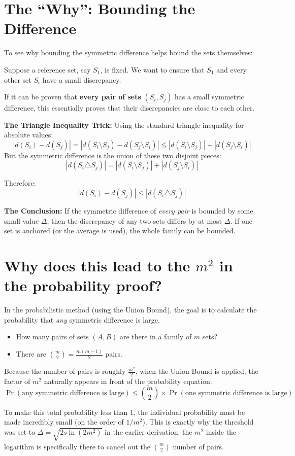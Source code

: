 \documentclass[11pt]{article}
\begin{document}
\hrulefill

\section{The ``Why'': Bounding the Difference}

To see why bounding the symmetric difference helps bound the sets themselves:

Suppose a reference set, say \(S_1\), is fixed. We want to ensure that \(S_1\) and every other set \(S_i\) have a small discrepancy. 

If it can be proven that \textbf{every pair of sets} \((S_i, S_j)\) has a small symmetric difference, this essentially proves that their discrepancies are close to each other. 

\textbf{The Triangle Inequality Trick:}
Using the standard triangle inequality for absolute values:
\[
 |d(S_i) - d(S_j)| = |d(S_i \setminus S_j) - d(S_j \setminus S_i)| \le |d(S_i \setminus S_j)| + |d(S_j \setminus S_i)| 
\]
But the symmetric difference is the union of these two disjoint pieces:
\[
 |d(S_i \triangle S_j)| = |d(S_i \setminus S_j)| + |d(S_j \setminus S_i)| 
\]

Therefore:
\[
 |d(S_i) - d(S_j)| \le |d(S_i \triangle S_j)| 
\]

\textbf{The Conclusion:} If the symmetric difference of \emph{every pair} is bounded by some small value \(\Delta\), then the discrepancy of any two sets differs by at most \(\Delta\). If one set is anchored (or the average is used), the whole family can be bounded.

\hrulefill

\section{Why does this lead to the \(m^2\) in the probability proof?}

In the probabilistic method (using the Union Bound), the goal is to calculate the probability that \emph{any} symmetric difference is large. 

\begin{itemize}
    \item How many pairs of sets \((A, B)\) are there in a family of \(m\) sets? 
    \item There are \(\binom{m}{2} = \frac{m(m-1)}{2}\) pairs.
\end{itemize}

Because the number of pairs is roughly \(\frac{m^2}{2}\), when the Union Bound is applied, the factor of \(m^2\) naturally appears in front of the probability equation:
\[
 \Pr(\text{any symmetric difference is large}) \le \binom{m}{2} \times \Pr(\text{one symmetric difference is large}) 
\]

To make this total probability less than 1, the individual probability must be made incredibly small (on the order of \(1/m^2\)). This is exactly why the threshold was set to \(\Delta = \sqrt{2s \ln(2m^2)}\) in the earlier derivation: the \(m^2\) inside the logarithm is specifically there to cancel out the \(\binom{m}{2}\) number of pairs.
\end{document}
